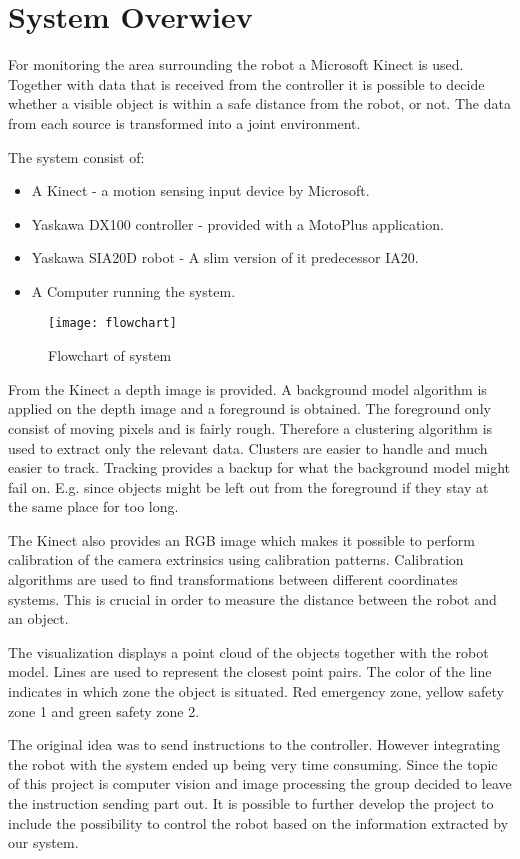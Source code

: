 
\section{System Overwiev}

For monitoring the area surrounding the robot a Microsoft Kinect is used. Together with data that is received from the controller it is possible to decide whether a visible object is within a safe distance from the robot, or not. The data from each source is transformed into a joint environment.

The system consist of:
\begin{itemize}
\item A Kinect - a motion sensing input device by Microsoft.
\item Yaskawa DX100 controller - provided with a MotoPlus application.
\item Yaskawa SIA20D robot - A slim version of it predecessor IA20.
\item A Computer running the system.
\end{itemize}

\begin{figure}[H]
\begin{center}
\texttt{[image: flowchart]}
\caption{Flowchart of system}
\label{flowchart}
\end{center}
\end{figure}




From the Kinect a depth image is provided. A background model algorithm is applied on the depth image and a foreground is obtained. The foreground only consist of moving pixels and is fairly rough. Therefore a clustering algorithm is used to extract only the relevant data. Clusters are easier to handle and much easier to track. Tracking provides a backup for what the background model might fail on. E.g. since objects might be left out from the foreground if they stay at the same place for too long.

The Kinect also provides an RGB image which makes it possible to perform calibration of the camera extrinsics using calibration patterns. Calibration algorithms are used to find transformations between different coordinates systems. This is crucial in order to measure the distance between the robot and an object.

The visualization displays a point cloud of the objects together with the robot model. Lines are used to represent the closest point pairs. The color of the line indicates in which zone the object is situated. Red emergency zone, yellow safety zone 1 and green safety zone 2.

The original idea was to send instructions to the controller. However integrating the robot with the system ended up being very time consuming. Since the topic of this project is computer vision and image processing the group decided to leave the instruction sending part out. It is possible to further develop the project to include the possibility to control the robot based on the information extracted by our system.


